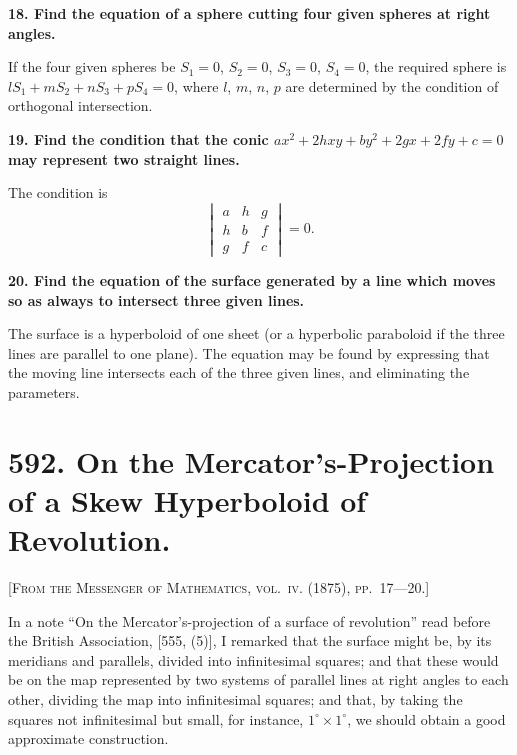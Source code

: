 \documentclass[11pt,a4paper]{article}
\theoremstyle{plain}
\theoremstyle{definition}
\theoremstyle{remark}
\begin{document}
\noindent\textbf{18. Find the equation of a sphere cutting four given spheres at right angles.}

If the four given spheres be $S_1 = 0$, $S_2 = 0$, $S_3 = 0$, $S_4 = 0$, the required sphere is $lS_1 + mS_2 + nS_3 + pS_4 = 0$, where $l$, $m$, $n$, $p$ are determined by the condition of orthogonal intersection.

\smallskip

\noindent\textbf{19. Find the condition that the conic $ax^2 + 2hxy + by^2 + 2gx + 2fy + c = 0$ may represent two straight lines.}

The condition is
\[
\begin{vmatrix}
a & h & g \\
h & b & f \\
g & f & c
\end{vmatrix} = 0.
\]

\smallskip

\noindent\textbf{20. Find the equation of the surface generated by a line which moves so as always to intersect three given lines.}

The surface is a hyperboloid of one sheet (or a hyperbolic paraboloid if the three lines are parallel to one plane). The equation may be found by expressing that the moving line intersects each of the three given lines, and eliminating the parameters.

\newpage

\section*{592. On the Mercator's-Projection of a Skew Hyperboloid of Revolution.}

\noindent\textsc{[From the Messenger of Mathematics, vol.~\textsc{iv}. (1875), pp.~17---20.]}

\medskip

\noindent In a note ``On the Mercator's-projection of a surface of revolution'' read before the British Association, [555, (5)], I remarked that the surface might be, by its meridians and parallels, divided into infinitesimal squares; and that these would be on the map represented by two systems of parallel lines at right angles to each other, dividing the map into infinitesimal squares; and that, by taking the squares not infinitesimal but small, for instance, $1^\circ \times 1^\circ$, we should obtain a good approximate construction.
\end{document}
